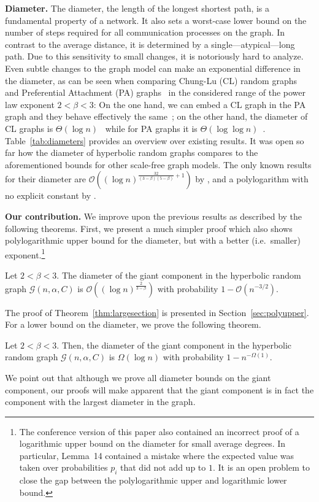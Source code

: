 \documentclass{llncs}
\newcommand{\Oh}{\mathcal{O}}
\newcommand{\tabref}[1]{Table~\ref{tab:#1}}
\newcommand{\thmref}[1]{Theorem~\ref{thm:#1}}
\newcommand{\secref}[1]{Section~\ref{sec:#1}}
\begin{document}
\textbf{Diameter.}
The diameter, the length of the longest shortest path, is a fundamental property of a network.
It also sets a worst-case lower bound on the number of steps required for all communication processes
on the graph. In contrast to the average distance, it is determined by a single---atypical---long path.
Due to this sensitivity to small changes, it is notoriously hard to analyze.
Even subtle changes to the graph model can make an exponential difference in the diameter, as can be seen when comparing
Chung-Lu (CL) random graphs~\cite{chung2002average} and
Preferential Attachment (PA) graphs~\cite{barabasi1999emergence} 
in the considered range of the  power law exponent $2 < \beta < 3$:
On the one hand, we can embed a CL graph in the PA graph and they behave effectively
the same~\cite{UltraFastRumor:unpub};
on the other hand,
the diameter of 
CL graphs is $\Theta(\log n)$~\cite{chung2002average}
while for PA graphs it is
$\Theta(\log \log n)$~\cite{diamPA}.
\tabref{diameters} provides an overview over existing results.
It was open so far how the diameter of hyperbolic random graphs compares to the aforementioned
bounds for other scale-free graph models.
The only known results for their diameter are
$\Oh((\log n)^{\frac{32}{(3-\beta)(5-\beta)}+1})$ by \citet{KiwiMitsche15}, and a polylogarithm with no explicit constant by \citet{bringmann2015geometric}.

\textbf{Our contribution.}
We improve upon the previous results as described by the following theorems.
First, we present a much simpler proof which also shows polylogarithmic upper bound for the diameter,
but with a better (i.e.\ smaller) exponent.\footnote{The conference version of this paper \cite{DBLP:conf/icalp/FriedrichK15} also contained an incorrect proof of a logarithmic upper bound on the diameter for small average degrees. In particular, Lemma~14 contained a mistake where the expected value was taken over probabilities $p_i$ that did not add up to $1$.
It is an open problem to close the gap between the polylogarithmic upper and logarithmic lower bound. }
\begin{theorem}
\label{thm:largesection}
Let $2 < \beta < 3$. The diameter of the giant component in the hyperbolic random graph $\mathcal G(n, \alpha, C)$ is $\Oh((\log n)^{\frac2 {3-\beta}})$ with probability $1 - \Oh(n^{-3/2})$.
\end{theorem}
The proof of \thmref{largesection} is presented in \secref{polyupper}.
For a lower bound on the diameter, we prove the following theorem.
\begin{theorem}
\label{thm:lowerbound}
Let $2 < \beta < 3$. Then, the diameter of the giant component in the hyperbolic random graph $\mathcal G(n, \alpha, C)$ is $\Omega(\log n)$ with probability $1 - n^{-\Omega(1)}$.
\end{theorem}
We point out that although we prove all diameter bounds on the giant component, our proofs will make apparent that the giant component is in fact the component with the largest diameter in the graph.
\medskip
\end{document}
